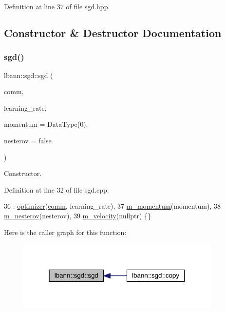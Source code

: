 Definition at line 37 of file sgd.\+hpp.



\subsection{Constructor \& Destructor Documentation}
\mbox{\label{classlbann_1_1sgd_a73baa574a5129872fe25f2a419c86baa}} 
\subsubsection{\texorpdfstring{sgd()}{sgd()}\hspace{0.1cm}{\footnotesize\ttfamily [1/2]}}
{\footnotesize\ttfamily lbann\+::sgd\+::sgd (\begin{DoxyParamCaption}\item[{\hyperlink{classlbann_1_1lbann__comm}{lbann\+\_\+comm} $\ast$}]{comm,  }\item[{Data\+Type}]{learning\+\_\+rate,  }\item[{Data\+Type}]{momentum = {\ttfamily DataType(0)},  }\item[{bool}]{nesterov = {\ttfamily false} }\end{DoxyParamCaption})}

Constructor. 

Definition at line 32 of file sgd.\+cpp.


\begin{DoxyCode}
36   : \hyperlink{classlbann_1_1optimizer_a136ed79c3f279ecded5be380fb67b05f}{optimizer}(\hyperlink{file__io_8cpp_ab048c6f9fcbcfaa57ce68b00263dbebe}{comm}, learning\_rate),
37     \hyperlink{classlbann_1_1sgd_a2e56d66d350debcf0d2c3ad76c214074}{m\_momentum}(momentum),
38     \hyperlink{classlbann_1_1sgd_a82da488e5d1530f50f67cd4ea30909cb}{m\_nesterov}(nesterov),
39     \hyperlink{classlbann_1_1sgd_a27f2d893014cef8357edffb63bf649f0}{m\_velocity}(\textcolor{keyword}{nullptr}) \{\}
\end{DoxyCode}
Here is the caller graph for this function\+:\nopagebreak
\begin{figure}[H]
\begin{center}
\leavevmode
\includegraphics[width=289pt]{classlbann_1_1sgd_a73baa574a5129872fe25f2a419c86baa_icgraph}
\end{center}
\end{figure}
\mbox{\label{classlbann_1_1sgd_ac0a74200f44b45ced9b44e3b6349581a}} 
